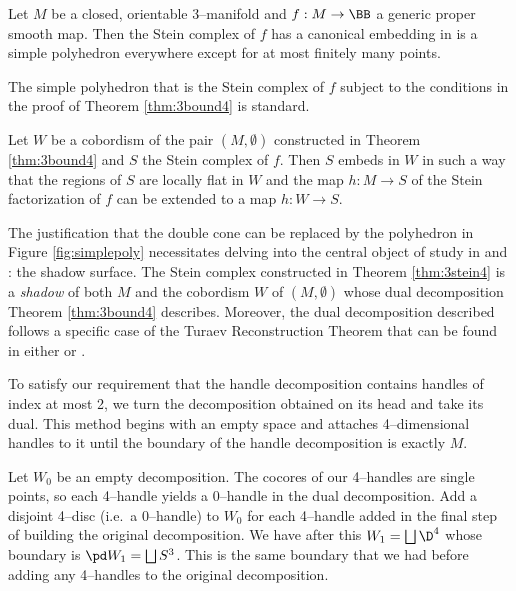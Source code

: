 \begin{theorem}
	Let $M$ be a closed, orientable 3--manifold and $f:M\to\BB$ a generic proper smooth map.
	Then the Stein complex of $f$ has a canonical embedding in  is a simple polyhedron everywhere except for at most finitely many points.
\end{theorem}



\begin{lem}
	The simple polyhedron that is the Stein complex of $f$ subject to the conditions in the proof of Theorem \ref{thm:3bound4} is standard.
\end{lem}


\begin{theorem}	
	Let $W$ be a cobordism of the pair $(M,\emptyset)$ constructed in Theorem \ref{thm:3bound4} and $S$ the Stein complex of $f$.
	Then $S$ embeds in $W$ in such a way that the regions of $S$ are locally flat in $W$ and the map $h:M\to S$ of the Stein factorization of $f$ can be extended to a map $h:W\to S$.
\end{theorem}

\begin{rmk}
	The justification that the double cone can be replaced by the polyhedron in Figure \ref{fig:simplepoly} necessitates delving into the central object of study in \cite{CostThur08} and \cite{Turaev91}: the shadow surface.
	The Stein complex constructed in Theorem \ref{thm:3stein4} is a \emph{shadow} of both $M$ and the cobordism $W$ of $(M,\emptyset)$ whose dual decomposition Theorem \ref{thm:3bound4} describes.
	Moreover, the dual decomposition described follows a specific case of the Turaev Reconstruction Theorem that can be found in either \cite{CostThur08} or \cite{Turaev91}.
\end{rmk}







	To satisfy our requirement that the handle decomposition contains handles of index at most 2, we turn the decomposition obtained on its head and take its dual.
	This method begins with an empty space and attaches 4--dimensional handles to it until the boundary of the handle decomposition is exactly $M$.
	
	Let $W_0$ be an empty decomposition.
	The cocores of our 4--handles are single points, so each 4--handle yields a 0--handle in the dual decomposition.
	Add a disjoint 4--disc (i.e.\ a 0--handle) to $W_0$ for each 4--handle added in the final step of building the original decomposition.
	We have after this $W_1=\bigsqcup \D^4$ whose boundary is $\pd W_1 = \bigsqcup S^3$.
	This is the same boundary that we had before adding any 4--handles to the original decomposition.
	
